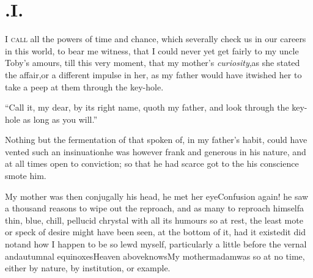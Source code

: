 \documentclass{article}
\begin{document}
\section{.\enspace I.}

\lettrine{I}{ call} all the powers of time and
chance, which severally check us in our careers in this world, to
bear me witness, that I could never yet get fairly to my uncle
Toby’s amours, till this very moment, that my
mother’s \textit{curiosity},\pb as she stated the
affair,\tsh or a different impulse in her, as my father
would have it\tsh wished her to take a peep at them
through the key-hole.

“Call it, my dear, by its right name, quoth my
father, and look through the key-hole as long as you
will.”

Nothing but the fermentation of that
spoken of, in my father’s habit, could
have vented such an insinuation\tsh he was however frank
and generous in his nature, and at all times open to conviction; so
that he had scarce got to the 
\break
his conscience smote him.

\newpage
My mother was then conjugally 
\newpage\noindent
his head, he met her eye\tsh Confusion again! he saw a thousand reasons to wipe out
the reproach, and as many to reproach himself\tsh a thin, blue, chill, pellucid
chrystal with all its humours so at rest, the least mote or speck of desire might
have been seen, at the bottom of it, had it existed\tsh it did not\tsh and how I
happen to be so lewd myself, particularly a little before the vernal and\break autumnal
equinoxes\tsh Heaven above\break knows\tsh My mother\tsh madam\break\tsh was so at no time,
either by nature, by institution, or example.
\end{document}
